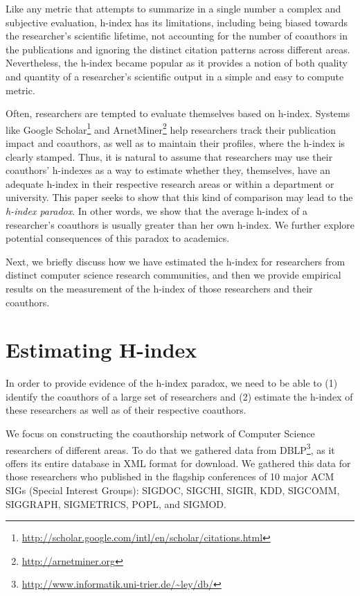 \documentclass[letterpaper]{article}
\begin{document}
Like any metric that attempts to summarize in a single number a complex and subjective evaluation, h-index has its limitations, including being biased towards the researcher’s scientific lifetime, not accounting for the number of coauthors in the publications and ignoring the distinct citation patterns across different areas. Nevertheless, the h-index became popular as it provides a notion of both quality and quantity of a researcher's scientific output in a simple and easy to compute metric.

Often, researchers are tempted to evaluate themselves based on h-index. Systems like Google Scholar\footnote{\url{http://scholar.google.com/intl/en/scholar/citations.html}}  and ArnetMiner\footnote{\url{http://arnetminer.org}} help researchers track their publication impact and coauthors, as well as to maintain their profiles, where the h-index is clearly stamped. Thus, it is natural to assume that researchers may use their coauthors' h-indexes as a way to estimate whether they, themselves, have an adequate h-index in their respective research areas or within a department or university.
This paper seeks to show that this kind of comparison may lead to the \textit{h-index paradox}. In other words, we show that the average h-index of a researcher's coauthors is usually greater than her own h-index. We further explore potential consequences of this paradox to academics.

Next, we briefly discuss how we have estimated the h-index for researchers from distinct computer science research communities, and then we provide empirical results on the measurement of the h-index of those researchers and their coauthors.


\section{Estimating H-index}


In order to provide evidence of the h-index paradox, we need to be able to (1) identify the coauthors of a large set of researchers and (2) estimate the h-index of these researchers as well as of their respective coauthors.

We focus on constructing the coauthorship network of Computer Science researchers of different areas. To do that we gathered data from DBLP\footnote{\url{http://www.informatik.uni-trier.de/~ley/db/}}, as it offers its entire database in XML format for download. We gathered this data for those researchers who published in the flagship conferences of 10 major ACM SIGs (Special Interest Groups): SIGDOC, SIGCHI, SIGIR, KDD, SIGCOMM, SIGGRAPH, SIGMETRICS, POPL, and SIGMOD.
\end{document}
